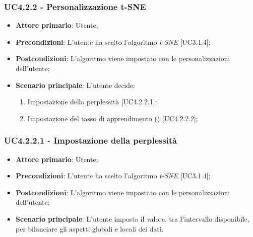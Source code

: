 \subsubsection{UC4.2.2 - Personalizzazione t-SNE}
\begin{itemize}
	\item \textbf{Attore primario}: Utente;
	
	\item \textbf{Precondizioni}: L'utente ha scelto l'algoritmo \textit{t-SNE} [UC3.1.4];
	
	\item \textbf{Postcondizioni}: L'algoritmo viene impostato con le personalizzazioni dell'utente;
	
	\item \textbf{Scenario principale}: L'utente decide:

\begin{enumerate}
\item Impostazione della perplessità [UC4.2.2.1];
\item Impostazione del tasso di apprendimento () [UC4.2.2.2];
\end{enumerate}	

\end{itemize}
	
	
\subsubsection{UC4.2.2.1 - Impostazione della perplessità}
\begin{itemize}
	\item \textbf{Attore primario}: Utente;
	
	\item \textbf{Precondizioni}: L'utente ha scelto l'algoritmo \textit{t-SNE} [UC3.1.4];
	
	\item \textbf{Postcondizioni}: L'algoritmo viene impostato con le personalizzazioni dell'utente;
	
	\item \textbf{Scenario principale}: L'utente imposta il valore, tra l'intervallo disponibile, per bilanciare gli aspetti globali e locali dei dati.

\end{itemize}
	
